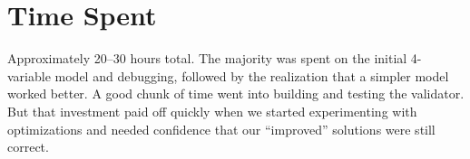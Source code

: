 \documentclass[11pt]{article}
\begin{document}
\section*{Time Spent}

Approximately 20--30 hours total. The majority was spent on the initial 4-variable model and debugging, followed by the realization that a simpler model worked better. A good chunk of time went into building and testing the validator. But that investment paid off quickly when we started experimenting with optimizations and needed confidence that our ``improved'' solutions were still correct.
\end{document}
